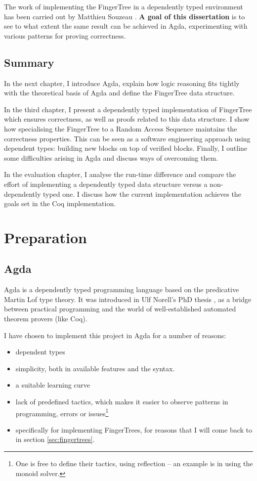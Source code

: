 \documentclass[12pt,twoside,notitlepage]{report}
\begin{document}
The work of implementing the FingerTree in a dependently typed  environment has been carried out by Matthieu Souzeau \cite{coq}. \textbf{A goal of this dissertation} is to see to what extent the same result can be achieved in Agda, experimenting with various patterns for proving correctness.


\section{Summary}

In the next chapter, I introduce Agda, explain how logic reasoning fits tightly with the theoretical basis of Agda and define the FingerTree data structure. 

In the third chapter, I present a dependently typed implementation of FingerTree which ensures correctness, as well as proofs related to this data structure. I show how specialising the FingerTree to a Random Access Sequence maintains the correctness properties. This can be seen as a software engineering approach using dependent types: building new blocks on top of verified blocks. 
Finally, I outline some difficulties arising in Agda and discuss ways of overcoming them.

In the evaluation chapter, I analyse the run-time difference and compare the effort of implementing a dependently typed data structure versus a non-dependently typed one. I discuss how the current implementation achieves the goals set in the Coq implementation.
 
\chapter{Preparation}

\section{Agda}

Agda\cite{agdatutorial} is a dependently typed programming language based on the predicative Martin Lof type theory. It was introduced in Ulf Norell’s PhD thesis \cite{agdaphd}, as a bridge between practical programming and the world of well-established automated theorem provers (like Coq). 

I have chosen to implement this project in Agda for a number of reasons: 
\begin{itemize}

\item dependent types
\item simplicity, both in available features and the syntax.
\item a suitable learning curve
\item lack of predefined tactics, which makes it easier to observe patterns in programming, errors or issues\footnote{One is free to define their tactics, using reflection  – an example is in using the monoid solver.}
\item specifically for implementing FingerTrees, for reasons that I will come back to in section \ref{sec:fingertrees}.
\end{itemize}
\end{document}
